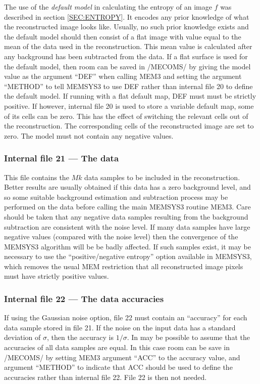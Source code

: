 The use of the {\em default model} in calculating the entropy of an image $f$
was described in section \ref {SEC:ENTROPY}. It encodes any prior knowledge of
what the reconstructed image looks like. Usually, no such prior  knowledge
exists and the default model should then consist of a flat image with value
equal to the mean of the data used in the reconstruction. This mean value is
calculated after any background has been subtracted from  the data. If a flat
surface is used for the default model, then room can be  saved in /MECOMS/ by
giving the model value as the argument ``DEF'' when calling  MEM3 and setting
the argument ``METHOD'' to tell MEMSYS3 to use DEF rather than  internal file
20 to define the default model. If running with a flat default map, DEF must
must be strictly positive. If however, internal file 20 is used to store a
variable default map, some of its cells can be zero. This has the  effect of
switching the relevant cells out of the reconstruction. The corresponding cells
of the reconstructed image are set to zero. The model must not contain any
negative values.

\subsubsection {Internal file 21 --- The data}

This file contains the $Mk$ data samples to be included in the reconstruction.
Better results are usually obtained if this data has a zero background level,
and so some suitable background estimation and subtraction process may be
performed on the data before calling the main MEMSYS3 routine MEM3. Care should
be taken that any negative data samples resulting from the background
subtraction are consistent with the noise level. If many data samples have
large  negative values (compared with the noise level) then the convergence of
the MEMSYS3 algorithm will be be badly affected. If such samples exist, it may
be necessary to use the ``positive/negative entropy'' option available in
MEMSYS3, which removes the usual MEM restriction that all reconstructed image
pixels must have strictly positive values.

\subsubsection {Internal file 22 --- The data accuracies}

If using the Gaussian noise option, file 22 must contain an ``accuracy'' for
each data sample stored in file 21. If the noise on the input data has a
standard  deviation of $\sigma$, then the accuracy is $1/\sigma$. In may be
possible to assume that the accuracies of all data samples are equal.  In this
case room can be save in /MECOMS/ by setting MEM3 argument ``ACC'' to  the
accuracy value, and argument ``METHOD'' to indicate that ACC should be used  to
define the accuracies rather than internal file 22. File 22 is then not
needed.

